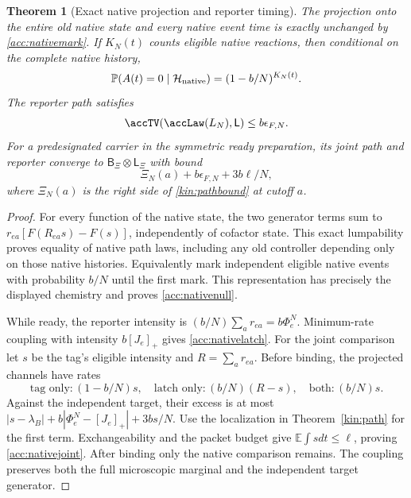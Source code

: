 \documentclass[11pt,oneside,openany]{book}
\newtheorem{theorem}{Theorem}[chapter]
\theoremstyle{definition}
\theoremstyle{remark}\newtheorem{remark}[theorem]{Remark}
\begin{document}
\begin{theorem}[Exact native projection and reporter timing]\label{acc:reporter}
The projection onto the entire old native state and every native event time
is exactly unchanged by \eqref{acc:nativemark}. If $K_N(t)$ counts
eligible native reactions, then conditional on the complete native history,
\begin{equation}
 \mathbb P(A(t)=0\mid\mathcal H_{
\rm native})=(1-b/N)^{K_N(t)}.
 \label{acc:nativenull}
\end{equation}
The reporter path satisfies
\begin{equation}
 \accTV(\accLaw(L_N),\mathsf L)\le b\epsilon_{F,N}.
 \label{acc:nativelatch}
\end{equation}
For a predesignated carrier in the symmetric ready preparation, its joint
path and reporter converge to $\mathsf B_\Xi\otimes\mathsf L_
\Xi$ with bound
\begin{equation}
 \Xi_N(a)+b\epsilon_{F,N}+3b\ell/N,
 \label{acc:nativejoint}
\end{equation}
where $\Xi_N(a)$ is the right side of \eqref{kin:pathbound} at cutoff $a$.
\end{theorem}
\begin{proof}
For every function of the native state, the two generator terms sum to
$r_{ea}[F(R_{ea}s)-F(s)]$, independently of cofactor state. This exact
lumpability proves equality of native path laws, including any old
controller depending only on those native histories. Equivalently mark
independent eligible native events with probability $b/N$ until the first
mark. This representation has precisely the displayed chemistry and
proves \eqref{acc:nativenull}.

While ready, the reporter intensity is
$(b/N)\sum_ar_{ea}=b\Phi_e^N$. Minimum-rate coupling with intensity
$b[J_e]_+$ gives \eqref{acc:nativelatch}. For the joint comparison let $s$
be the tag's eligible intensity and $R=\sum_ar_{ea}$. Before binding,
the projected channels have rates
\[
 \text{tag only}:(1-b/N)s,\quad
 \text{latch only}:(b/N)(R-s),\quad
 \text{both}:(b/N)s.
\]
Against the independent target, their excess is at most
$|s-\lambda_B|+b|\Phi_e^N-[J_e]_+|+3bs/N$.
Use the localization in Theorem~\ref{kin:path} for the first term.
Exchangeability and the packet budget give $\mathbb E\int sdt\le\ell$,
proving \eqref{acc:nativejoint}. After binding only the native comparison
remains. The coupling preserves both the full microscopic marginal and
the independent target generator.
\end{proof}
\end{document}
